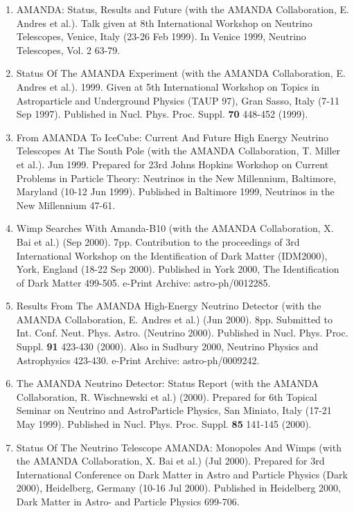 \begin{enumerate}
\item AMANDA: Status, Results and Future (with the AMANDA
  Collaboration, E. Andres et al.).  Talk given at 8th International
  Workshop on Neutrino Telescopes, Venice, Italy (23-26 Feb 1999).  In
  Venice 1999, Neutrino Telescopes, Vol. 2 63-79.

\item Status Of The AMANDA Experiment (with the AMANDA Collaboration,
  E. Andres et al.). 1999. Given at 5th International Workshop on
  Topics in Astroparticle and Underground Physics (TAUP 97), Gran
  Sasso, Italy (7-11 Sep 1997).  Published in
  Nucl. Phys. Proc. Suppl. {\bf 70} 448-452 (1999).

\item From AMANDA To IceCube: Current And Future High Energy Neutrino
  Telescopes At The South Pole (with the AMANDA Collaboration,
  T. Miller et al.). Jun 1999. Prepared for 23rd Johns Hopkins
  Workshop on Current Problems in Particle Theory: Neutrinos in the
  New Millennium, Baltimore, Maryland (10-12 Jun 1999).  Published in
  Baltimore 1999, Neutrinos in the New Millennium 47-61.

\item Wimp Searches With Amanda-B10 (with the AMANDA Collaboration,
  X. Bai et al.) (Sep 2000). 7pp. Contribution to the proceedings of
  3rd International Workshop on the Identification of Dark Matter
  (IDM2000), York, England (18-22 Sep 2000).  Published in York 2000,
  The Identification of Dark Matter 499-505. e-Print Archive:
  astro-ph/0012285.

\item Results From The AMANDA High-Energy Neutrino Detector (with the
  AMANDA Collaboration, E. Andres et al.) (Jun 2000). 8pp. Submitted
  to Int. Conf. Neut. Phys. Astro. (Neutrino 2000).  Published in
  Nucl. Phys. Proc. Suppl. {\bf 91} 423-430 (2000). Also in Sudbury
  2000, Neutrino Physics and Astrophysics 423-430. e-Print Archive:
  astro-ph/0009242.

\item The AMANDA Neutrino Detector: Status Report (with the AMANDA
  Collaboration, R. Wischnewski et al.) (2000).  Prepared for 6th
  Topical Seminar on Neutrino and AstroParticle Physics, San Miniato,
  Italy (17-21 May 1999).  Published in Nucl. Phys. Proc. Suppl. {\bf
    85} 141-145 (2000).

\item Status Of The Neutrino Telescope AMANDA: Monopoles And Wimps
  (with the AMANDA Collaboration, X. Bai et al.) (Jul 2000).  Prepared
  for 3rd International Conference on Dark Matter in Astro and
  Particle Physics (Dark 2000), Heidelberg, Germany (10-16 Jul 2000).
  Published in Heidelberg 2000, Dark Matter in Astro- and Particle
  Physics 699-706.


\end{enumerate}
